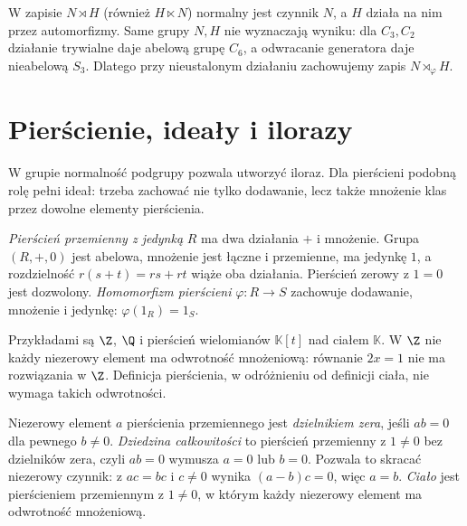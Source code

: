 \begin{uwaga}
W zapisie $N\rtimes H$ (również $H\ltimes N$) normalny jest czynnik
$N$, a $H$ działa na nim przez automorfizmy. Same grupy $N,H$ nie
wyznaczają wyniku: dla $C_3,C_2$ działanie trywialne daje abelową
grupę $C_6$, a odwracanie generatora daje nieabelową $S_3$.
Dlatego przy nieustalonym działaniu zachowujemy zapis $N\rtimes_\varphi H$.
\end{uwaga}


\section{Pierścienie, ideały i ilorazy}
\label{sec:pierscienie-idealy}

W grupie normalność podgrupy pozwala utworzyć
iloraz. Dla pierścieni podobną rolę pełni ideał:
trzeba zachować nie tylko dodawanie, lecz także
mnożenie klas przez dowolne elementy pierścienia.

\begin{definicja}
\label{def:pierscien-przemienny}
\emph{Pierścień przemienny z jedynką} $R$ ma
dwa działania $+$ i mnożenie. Grupa $(R,+,0)$
jest abelowa, mnożenie jest łączne i przemienne,
ma jedynkę $1$, a rozdzielność
$r(s+t)=rs+rt$ wiąże oba działania.
Pierścień zerowy z $1=0$ jest dozwolony.
\emph{Homomorfizm pierścieni}
$\varphi:R\to S$ zachowuje dodawanie, mnożenie
i jedynkę: $\varphi(1_R)=1_S$.
\end{definicja}

Przykładami są $\Z$, $\Q$ i pierścień
wielomianów $\mathbb K[t]$ nad ciałem $\mathbb K$.
W $\Z$ nie każdy niezerowy element ma odwrotność
mnożeniową: równanie $2x=1$ nie ma rozwiązania
w $\Z$. Definicja pierścienia, w odróżnieniu od definicji
ciała, nie wymaga takich odwrotności.

\begin{definicja}
\label{def:dziedzina-cialo-5}
Niezerowy element $a$ pierścienia przemiennego jest \emph{dzielnikiem
zera}, jeśli $ab=0$ dla pewnego $b\ne0$. \emph{Dziedzina całkowitości}
to pierścień przemienny z $1\ne0$ bez dzielników zera, czyli
$ab=0$ wymusza $a=0$ lub $b=0$. Pozwala to skracać niezerowy czynnik:
z $ac=bc$ i $c\ne0$ wynika $(a-b)c=0$, więc $a=b$.
\emph{Ciało} jest pierścieniem przemiennym z $1\ne0$, w którym
każdy niezerowy element ma odwrotność mnożeniową.
\end{definicja}

